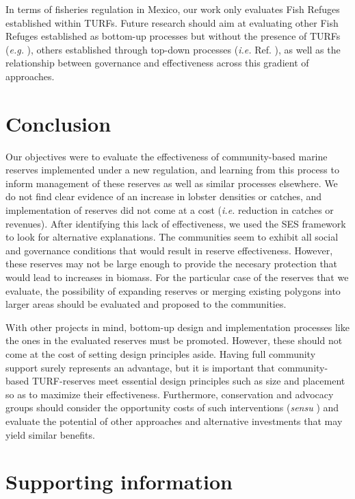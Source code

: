 \documentclass[10pt,letterpaper]{article}
\begin{document}
In terms of fisheries regulation in Mexico, our work only evaluates Fish Refuges established within TURFs. Future research should aim at evaluating other Fish Refuges established as bottom-up processes but without the presence of TURFs (\emph{e.g.} \cite{dof_websiteC_2012}), others established through top-down processes (\emph{i.e.} Ref. \cite{dof_websiteU_2018}), as well as the relationship between governance and effectiveness across this gradient of approaches. 

\section*{Conclusion}

Our objectives were to evaluate the effectiveness of community-based marine reserves implemented under a new regulation, and learning from this process to inform management of these reserves as well as similar processes elsewhere. We do not find clear evidence of an increase in lobster densities or catches, and implementation of reserves did not come at a cost (\emph{i.e.} reduction in catches or revenues). After identifying this lack of effectiveness, we used the SES framework to look for alternative explanations. The communities seem to exhibit all social and governance conditions that would result in reserve effectiveness. However, these reserves may not be large enough to provide the necesary protection that would lead to increases in biomass. For the particular case of the reserves that we evaluate, the possibility of expanding reserves or merging existing polygons into larger areas should be evaluated and proposed to the communities.

With other projects in mind, bottom-up design and implementation processes like the ones in the evaluated reserves must be promoted. However, these should not come at the cost of setting design principles aside. Having full community support surely represents an advantage, but it is important that community-based TURF-reserves meet essential design principles such as size and placement so as to maximize their effectiveness. Furthermore, conservation and advocacy groups should consider the opportunity costs of such interventions (\emph{sensu} \cite{smith_2010}) and evaluate the potential of other approaches and alternative investments that may yield similar benefits.

\section*{Supporting information}
\end{document}
